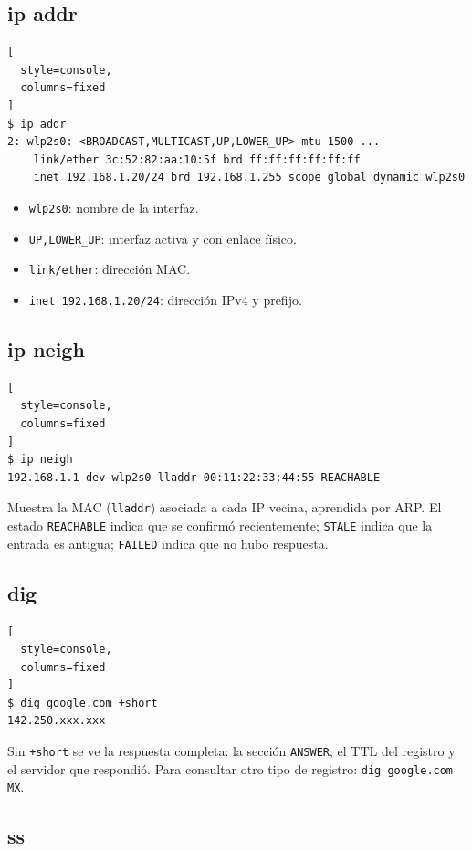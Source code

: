 \documentclass[11pt,a4paper]{article}
\theoremstyle{definition}
\theoremstyle{remark}
\newcommand{\cmd}[1]{\texttt{#1}}
\begin{document}
\subsection{ip addr}

\begin{lstlisting}[
  style=console,
  columns=fixed
]
$ ip addr
2: wlp2s0: <BROADCAST,MULTICAST,UP,LOWER_UP> mtu 1500 ...
    link/ether 3c:52:82:aa:10:5f brd ff:ff:ff:ff:ff:ff
    inet 192.168.1.20/24 brd 192.168.1.255 scope global dynamic wlp2s0
\end{lstlisting}

\begin{itemize}
  \item \texttt{wlp2s0}: nombre de la interfaz.
  \item \texttt{UP,LOWER\_UP}: interfaz activa y con enlace físico.
  \item \texttt{link/ether}: dirección MAC.
  \item \texttt{inet 192.168.1.20/24}: dirección IPv4 y prefijo.
\end{itemize}

\subsection{ip neigh}

\begin{lstlisting}[
  style=console,
  columns=fixed
]
$ ip neigh
192.168.1.1 dev wlp2s0 lladdr 00:11:22:33:44:55 REACHABLE
\end{lstlisting}

Muestra la MAC (\texttt{lladdr}) asociada a cada IP vecina, aprendida por ARP. El estado \texttt{REACHABLE} indica que se confirmó recientemente; \texttt{STALE} indica que la entrada es antigua; \texttt{FAILED} indica que no hubo respuesta.

\subsection{dig}

\begin{lstlisting}[
  style=console,
  columns=fixed
]
$ dig google.com +short
142.250.xxx.xxx
\end{lstlisting}

Sin \texttt{+short} se ve la respuesta completa: la sección \texttt{ANSWER}, el TTL del registro y el servidor que respondió. Para consultar otro tipo de registro: \cmd{dig google.com MX}.

\subsection{ss}
\end{document}

